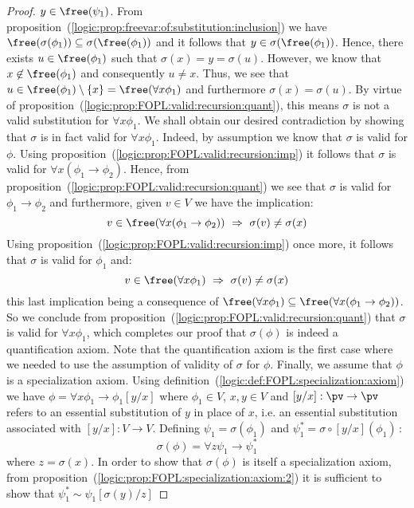 \begin{proof}
$y\in\free(\psi_{1})$. From
proposition~(\ref{logic:prop:freevar:of:substitution:inclusion}) we
have $\free(\sigma(\phi_{1}))\subseteq\sigma(\free(\phi_{1}))$ and
it follows that $y\in\sigma(\free(\phi_{1}))$. Hence, there exists
$u\in\free(\phi_{1})$ such that $\sigma(x)=y=\sigma(u)$. However, we
know that $x\not\in\free(\phi_{1})$ and consequently $u\neq x$.
Thus, we see that $u\in\free(\phi_{1})\setminus\{x\}=\free(\forall
x\phi_{1})$ and furthermore $\sigma(x)=\sigma(u)$. By virtue of
proposition~(\ref{logic:prop:FOPL:valid:recursion:quant}), this
means $\sigma$ is not a valid substitution for $\forall x\phi_{1}$.
We shall obtain our desired contradiction by showing that $\sigma$
is in fact valid for $\forall x\phi_{1}$. Indeed, by assumption we
know that $\sigma$ is valid for $\phi$. Using
proposition~(\ref{logic:prop:FOPL:valid:recursion:imp}) it follows
that $\sigma$ is valid for $\forall x(\phi_{1}\to\phi_{2})$. Hence,
from proposition~(\ref{logic:prop:FOPL:valid:recursion:quant}) we
see that $\sigma$ is valid for $\phi_{1}\to\phi_{2}$ and
furthermore, given $v\in V$ we have the implication:
    \[
    v\in\free(\forall x(\phi_{1}\to\phi_{2}))\ \Rightarrow\
    \sigma(v)\neq\sigma(x)
    \]
Using proposition~(\ref{logic:prop:FOPL:valid:recursion:imp}) once
more, it follows that $\sigma$ is valid for $\phi_{1}$ and:
    \[
    v\in\free(\forall x\phi_{1})\ \Rightarrow\
    \sigma(v)\neq\sigma(x)
    \]
this last implication being a consequence of $\free(\forall
x\phi_{1})\subseteq\free(\forall x(\phi_{1}\to\phi_{2}))$. So we
conclude from
proposition~(\ref{logic:prop:FOPL:valid:recursion:quant}) that
$\sigma$ is valid for $\forall x\phi_{1}$, which completes our proof
that $\sigma(\phi)$ is indeed a quantification axiom. Note that the
quantification axiom is the first case where we needed to use the
assumption of validity of $\sigma$ for $\phi$. Finally, we assume
that $\phi$ is a specialization axiom. Using
definition~(\ref{logic:def:FOPL:specialization:axiom}) we have $\phi
=\forall x\phi_{1}\to\phi_{1}[y/x]$ where $\phi_{1}\in V$, $x,y\in
V$ and $[y/x]:\pv\to\pv$ refers to an essential substitution of $y$
in place of $x$, i.e. an essential substitution associated with
$[y/x]:V\to V$. Defining $\psi_{1}=\sigma(\phi_{1})$  and
$\psi_{1}^{*}=\sigma\circ[y/x](\phi_{1})$\,:
    \[
    \sigma(\phi)=\forall z\psi_{1}\to\psi_{1}^{*}
    \]
where $z=\sigma(x)$. In order to show that $\sigma(\phi)$ is itself
a specialization axiom, from
proposition~(\ref{logic:prop:FOPL:specialization:axiom:2}) it is
sufficient to show that $\psi_{1}^{*}\sim\psi_{1}[\sigma(y)/z]$

\end{proof}
